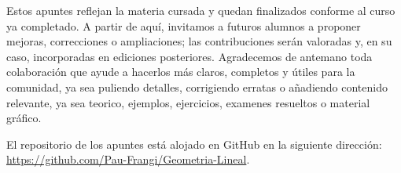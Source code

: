 Estos apuntes reflejan la materia cursada y quedan finalizados conforme al curso ya completado. A partir de aquí, invitamos a futuros alumnos a proponer mejoras, correcciones o ampliaciones; las contribuciones serán valoradas y, en su caso, incorporadas en ediciones posteriores. Agradecemos de antemano toda colaboración que ayude a hacerlos más claros, completos y útiles para la comunidad, ya sea puliendo detalles, corrigiendo erratas o añadiendo contenido relevante, ya sea teorico, ejemplos, ejercicios, examenes resueltos o material gráfico.

El repositorio de los apuntes está alojado en GitHub en la siguiente dirección: \url{https://github.com/Pau-Frangi/Geometria-Lineal}.